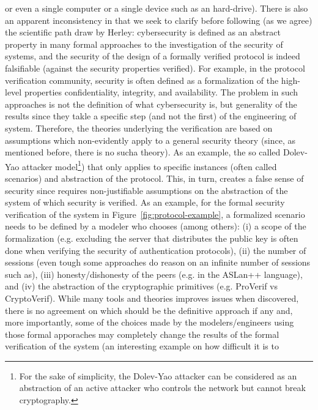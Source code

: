 or even a single computer or a single device such as an hard-drive).  There is
also an apparent inconsistency in\autocite{Herley2016unfalsifiability} that we
seek to clarify before following (as we agree) the scientific path draw by
Herley: cybersecurity is defined as an abstract property in many formal
approaches to the investigation of the security of systems, and the security of the design of a
formally verified protocol is indeed falsifiable (against the security properties verified).  For example, in the protocol
verification community, security is often defined as a formalization of the
high-level properties confidentiality, integrity, and availability. The problem
in such approaches is not the definition of what cybersecurity is, but 
generality of the results since they takle a specific step (and not the first) of the engineering of system.
Therefore, the theories underlying the verification are based on 
assumptions which non-evidently apply to a general security theory (since, as mentioned before,
there is no sucha theory).
As an example, the so called Dolev-Yao attacker model\footnote{For the sake of
simplicity, the Dolev-Yao attacker can be considered as an abstraction of an
active attacker who controls the network but cannot break
cryptography.}\autocite{Dolev1983security})
that only applies to specific instances (often called scenarios) and
abstraction of the protocol. This, in turn, creates a false sense of security
since requires non-justifiable assumptions on the abstraction of the system of which security
is verified. As an example, for the formal security verification of the system
in Figure~\ref{fig:protocol-example}, a formalized scenario needs to be defined
by a modeler who chooses (among others): (i) a scope of the formalization (e.g.
excluding the server that distributes the public key is often done when
verifying the security of authentication protocols), (ii) the number of
sessions (even tough some approaches do reason on an infinite number of
sessions such as\autocite{Escobar2007maudenpa}), (iii) honesty/dishonesty of
the peers (e.g.  in the ASLan++ language\autocite{Oheimb2010aslan++}), and (iv)
the abstraction of the cryptographic primitives (e.g.  ProVerif vs
CryptoVerif\autocite{Blanchet2017symbolic}).  While many tools and theories
improves issues when discovered, there is no agreement on which should be
the definitive approach if any and, more importantly, some of the choices made by the modelers/engineers using those formal apporaches may
completely change the results of the formal verification of the system (an interesting example on how difficult it is to 
